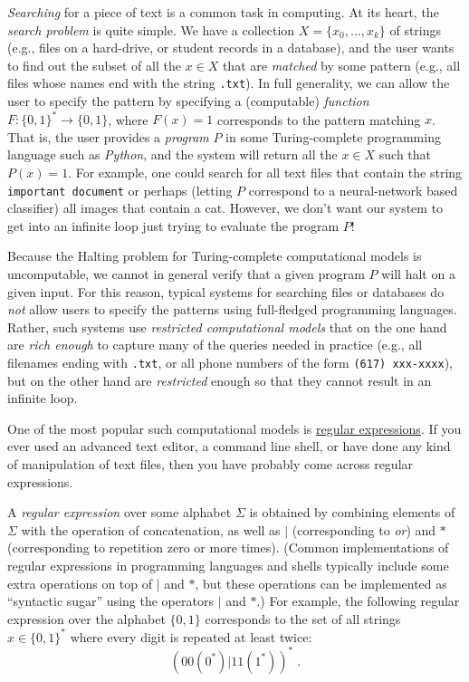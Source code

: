 \emph{Searching} for a piece of text is a common task in computing. At
its heart, the \emph{search problem} is quite simple. We have a
collection \(X = \{ x_0, \ldots, x_k \}\) of strings (e.g., files on a
hard-drive, or student records in a database), and the user wants to
find out the subset of all the \(x \in X\) that are \emph{matched} by
some pattern (e.g., all files whose names end with the string
\texttt{.txt}). In full generality, we can allow the user to specify the
pattern by specifying a (computable) \emph{function}
\(F:\{0,1\}^* \rightarrow \{0,1\}\), where \(F(x)=1\) corresponds to the
pattern matching \(x\). That is, the user provides a \emph{program}
\(P\) in some Turing-complete programming language such as
\emph{Python}, and the system will return all the \(x \in X\) such that
\(P(x)=1\). For example, one could search for all text files that
contain the string \texttt{important document} or perhaps (letting \(P\)
correspond to a neural-network based classifier) all images that contain
a cat. However, we don't want our system to get into an infinite loop
just trying to evaluate the program \(P\)!

Because the Halting problem for Turing-complete computational models is
uncomputable, we cannot in general verify that a given program \(P\)
will halt on a given input. For this reason, typical systems for
searching files or databases do \emph{not} allow users to specify the
patterns using full-fledged programming languages. Rather, such systems
use \emph{restricted computational models} that on the one hand are
\emph{rich enough} to capture many of the queries needed in practice
(e.g., all filenames ending with \texttt{.txt}, or all phone numbers of
the form \texttt{(617) xxx-xxxx}), but on the other hand are
\emph{restricted} enough so that they cannot result in an infinite loop.

One of the most popular such computational models is
\href{https://goo.gl/2vTAFU}{regular expressions}. If you ever used an
advanced text editor, a command line shell, or have done any kind of
manipulation of text files, then you have probably come across regular
expressions.

A \emph{regular expression} over some alphabet \(\Sigma\) is obtained by
combining elements of \(\Sigma\) with the operation of concatenation, as
well as \(|\) (corresponding to \emph{or}) and \(*\) (corresponding to
repetition zero or more times). (Common implementations of regular
expressions in programming languages and shells typically include some
extra operations on top of \(|\) and \(*\), but these operations can be
implemented as ``syntactic sugar'' using the operators \(|\) and \(*\).)
For example, the following regular expression over the alphabet
\(\{0,1\}\) corresponds to the set of all strings \(x\in \{0,1\}^*\)
where every digit is repeated at least twice: \[
(00(0^*)|11(1^*))^* \;.
\]

